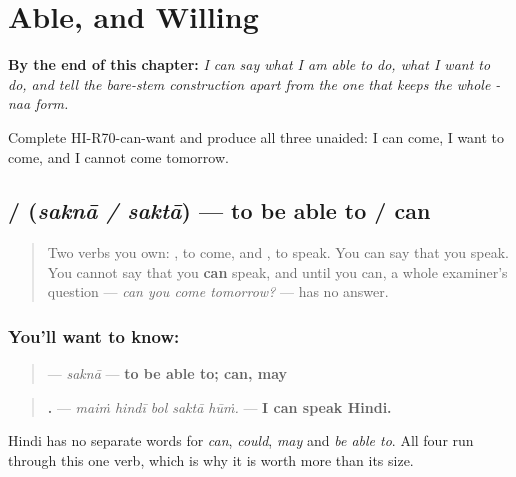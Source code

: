 
\chapter{Able, and Willing}
\label{ch:hi-can-and-want}

\begin{chapteropening}
\textbf{By the end of this chapter:} \emph{I can say what I am able to do, what I want to do, and tell the bare-stem construction apart from the one that keeps the whole -naa form.}

Complete HI-R70-can-want and produce all three unaided: I can come, I want to come, and I cannot come tomorrow.
\end{chapteropening}

\section[\texorpdfstring{\hi{सकना} / \hi{सकता} (saknā / saktā)}{सकना / सकता (saknā / saktā)}]{ /  (\emph{saknā / saktā}) — to be able to / can}

\label{lesson:HI-C70-sakna}



\begin{quote}
Two verbs you own: \textbf{}, to come, and \textbf{}, to speak. You can say that you speak. You cannot say that you \textbf{can} speak, and until you can, a whole examiner's question — \emph{can you come tomorrow?} — has no answer.
\end{quote}

\subsection*{You'll want to know: }
\begin{quote}
\textbf{} — \emph{saknā} — \textbf{to be able to; can, may}
\end{quote}

\begin{quote}
\textbf{    .} — \emph{maiṁ hindī bol saktā hūṁ.} — \textbf{I can speak Hindi.}
\end{quote}

Hindi has no separate words for \emph{can}, \emph{could}, \emph{may} and \emph{be able to}. All four run through this one verb, which is why it is worth more than its size.

